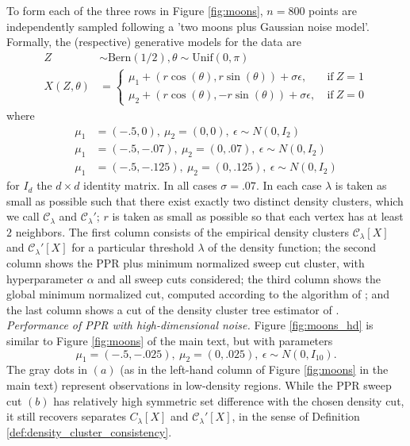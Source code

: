 \documentclass[twoside,11pt]{article}
\newcommand{\1}{\mathbf{1}}
\newcommand{\mc}[1]{\mathcal{#1}}
\begin{document}
To form each of the three rows in Figure \ref{fig:moons}, $n = 800$ points are independently sampled following a 'two moons plus Gaussian noise model'. Formally, the (respective) generative models for the data are
\begin{align}
Z & \sim \textrm{Bern}(1/2), \theta \sim \textrm{Unif}(0, \pi) \\
X(Z,\theta) & = 
\begin{cases}
\mu_1 + (r \cos(\theta), r \sin(\theta)) + \sigma \epsilon,~ & \text{if}~ Z = 1 \\
\mu_2 + (r \cos(\theta), - r \sin(\theta)) + \sigma \epsilon,~ & \text{if}~ Z = 0
\end{cases}
\end{align}
where 
\begin{align*}
\mu_1 & = (-.5, 0),~ \mu_2 = (0,0),~ \epsilon \sim N(0, I_2) \tag{row 1} \\
\mu_1 & = (-.5, -.07),~ \mu_2 = (0,.07),~ \epsilon \sim N(0, I_2) \tag{row 2} \\
\mu_1 & = (-.5, -.125),~ \mu_2 = (0,.125),~ \epsilon \sim N(0, I_2) \tag{row 3} 
\end{align*}
for $I_d$ the $d \times d$ identity matrix. In all cases $\sigma = .07$. In each case $\lambda$ is taken as small as possible such that there exist exactly two distinct density clusters, which we call $\mc{C}_{\lambda}$ and $\mc{C}_{\lambda}'$; $r$ is taken as small as possible so that each vertex has at least $2$ neighbors. The first column consists of the empirical density clusters $\mc{C}_{\lambda}[X]$ and $\mc{C}_{\lambda}'[X]$ for a particular threshold $\lambda$ of the density function; the second column shows the PPR plus minimum normalized sweep cut cluster, with hyperparameter $\alpha$ and all sweep cuts considered; the third column shows the global minimum normalized cut, computed according to the algorithm of \cite{bresson2013}; and the last column shows a cut of the density cluster tree estimator of \cite{chaudhuri2010}. \\

\noindent \emph{Performance of PPR with high-dimensional noise.} Figure \ref{fig:moons_hd} is similar to Figure \ref{fig:moons} of the main text, but with parameters
\begin{equation*}
\mu_1 = (-.5, -.025),~ \mu_2 = (0,.025),~ \epsilon \sim N(0, I_{10}).
\end{equation*}
The gray dots in $(a)$ (as in the left-hand column of Figure \ref{fig:moons} in the main text) represent observations in low-density regions. While the PPR sweep cut $(b)$ has relatively high symmetric set difference with the chosen density cut, it still recovers separates $C_{\lambda}[X]$ and $\mc{C}_{\lambda}'[X]$, in the sense of Definition \ref{def:density_cluster_consistency}.
\end{document}

